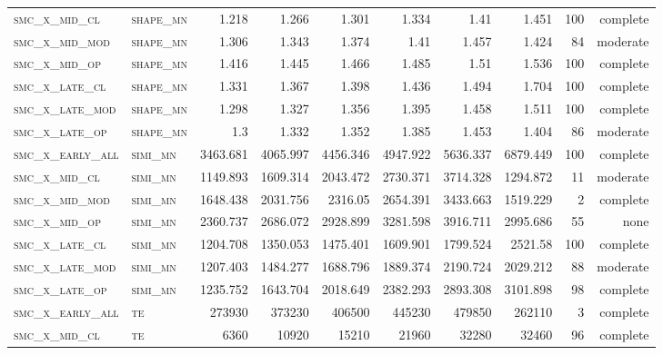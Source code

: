 \begin{landscape}
\begin{center}
\begin{footnotesize}
\begin{longtable}{llrrrrr|rrr}
\textsc{smc\_x\_mid\_cl   } & \textsc{shape\_mn }   & 1.218    & 1.266    & 1.301    & 1.334    & 1.41     & 1.451    & 100 & complete \\
\textsc{smc\_x\_mid\_mod  } & \textsc{shape\_mn }   & 1.306    & 1.343    & 1.374    & 1.41     & 1.457    & 1.424    & 84  & moderate \\
\textsc{smc\_x\_mid\_op   } & \textsc{shape\_mn }   & 1.416    & 1.445    & 1.466    & 1.485    & 1.51     & 1.536    & 100 & complete \\
\textsc{smc\_x\_late\_cl  } & \textsc{shape\_mn }   & 1.331    & 1.367    & 1.398    & 1.436    & 1.494    & 1.704    & 100 & complete \\
\textsc{smc\_x\_late\_mod } & \textsc{shape\_mn }   & 1.298    & 1.327    & 1.356    & 1.395    & 1.458    & 1.511    & 100 & complete \\
\textsc{smc\_x\_late\_op  } & \textsc{shape\_mn }   & 1.3      & 1.332    & 1.352    & 1.385    & 1.453    & 1.404    & 86  & moderate \\
\textsc{smc\_x\_early\_all} & \textsc{simi\_mn  }   & 3463.681 & 4065.997 & 4456.346 & 4947.922 & 5636.337 & 6879.449 & 100 & complete \\
\textsc{smc\_x\_mid\_cl   } & \textsc{simi\_mn  }   & 1149.893 & 1609.314 & 2043.472 & 2730.371 & 3714.328 & 1294.872 & 11  & moderate \\
\textsc{smc\_x\_mid\_mod  } & \textsc{simi\_mn  }   & 1648.438 & 2031.756 & 2316.05  & 2654.391 & 3433.663 & 1519.229 & 2   & complete \\
\textsc{smc\_x\_mid\_op   } & \textsc{simi\_mn  }   & 2360.737 & 2686.072 & 2928.899 & 3281.598 & 3916.711 & 2995.686 & 55  & none     \\
\textsc{smc\_x\_late\_cl  } & \textsc{simi\_mn  }   & 1204.708 & 1350.053 & 1475.401 & 1609.901 & 1799.524 & 2521.58  & 100 & complete \\
\textsc{smc\_x\_late\_mod } & \textsc{simi\_mn  }   & 1207.403 & 1484.277 & 1688.796 & 1889.374 & 2190.724 & 2029.212 & 88  & moderate \\
\textsc{smc\_x\_late\_op  } & \textsc{simi\_mn  }   & 1235.752 & 1643.704 & 2018.649 & 2382.293 & 2893.308 & 3101.898 & 98  & complete \\
\textsc{smc\_x\_early\_all} & \textsc{te  	    }   & 273930   & 373230   & 406500   & 445230   & 479850   & 262110   & 3   & complete \\
\textsc{smc\_x\_mid\_cl   } & \textsc{te        }   & 6360     & 10920    & 15210    & 21960    & 32280    & 32460    & 96  & complete \\

\end{longtable}
\end{footnotesize}
\end{center}
\end{landscape}
